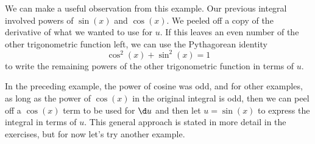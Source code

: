 \documentclass{ximera}
\begin{document}
We can make a useful observation from this example. Our previous integral involved powers of $\sin(x)$ and $\cos(x)$. We peeled off a copy of the derivative of what we wanted to use for $u$.  If this leaves an even number of the other trigonometric function left, we can use the Pythagorean identity \[\cos^{2}(x)+ \sin^{2}(x) =1\] to write the remaining powers of the other trigonometric function in terms of $u$.  

In the preceding example, the power of cosine was odd, and for other examples, as long as the power of $\cos(x)$ in the original integral is odd, then we can peel off a $\cos(x)$ term to be used for $\d u$ and then let $u=\sin(x)$ to express the integral in terms of $u$.  This general approach is stated in more detail in the exercises, but for now let's try another example.
\end{document}

